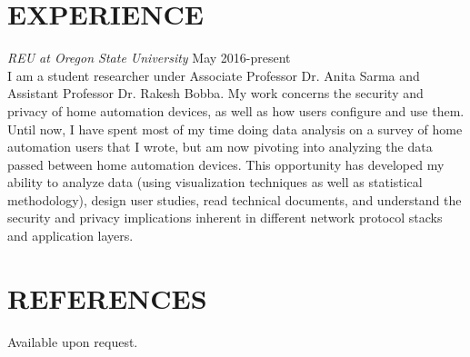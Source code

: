 \documentclass[line, margin]{res}
\begin{document}
\begin{resume}
\section{EXPERIENCE}
\textit{REU at Oregon State University} \hfill May 2016-present \\
I am a student researcher under Associate Professor Dr. Anita Sarma and Assistant Professor Dr. Rakesh Bobba. My work concerns the security and privacy of home automation devices, as well as how users configure and use them. Until now, I have spent most of my time doing data analysis on a survey of home automation users that I wrote, but am now pivoting into analyzing the data passed between home automation devices. This opportunity has developed my ability to analyze data (using visualization techniques as well as statistical methodology), design user studies, read technical documents, and understand the security and privacy implications inherent in different network protocol stacks and application layers.  \\ [10pt]

\section{REFERENCES}
Available upon request.

\end{resume}
\end{document}
